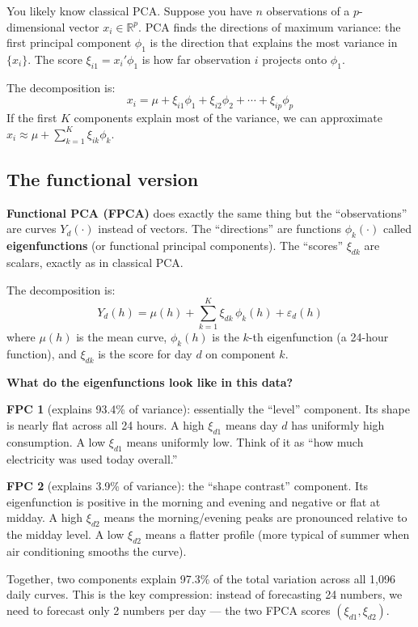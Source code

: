 \documentclass[11pt,a4paper]{article}
\begin{document}
You likely know classical PCA. Suppose you have $n$ observations of a
$p$-dimensional vector $x_i \in \mathbb{R}^p$. PCA finds the directions
of maximum variance: the first principal component $\phi_1$ is the
direction that explains the most variance in $\{x_i\}$. The score
$\xi_{i1} = x_i' \phi_1$ is how far observation $i$ projects onto $\phi_1$.

The decomposition is:
\[
x_i = \mu + \xi_{i1}\phi_1 + \xi_{i2}\phi_2 + \cdots + \xi_{ip}\phi_p
\]
If the first $K$ components explain most of the variance, we can
approximate $x_i \approx \mu + \sum_{k=1}^K \xi_{ik}\phi_k$.

\subsection{The functional version}

\textbf{Functional PCA (FPCA)} does exactly the same thing but the
``observations'' are curves $Y_d(\cdot)$ instead of vectors. The
``directions'' are functions $\phi_k(\cdot)$ called
\textbf{eigenfunctions} (or functional principal components). The
``scores'' $\xi_{dk}$ are scalars, exactly as in classical PCA.

The decomposition is:
\[
Y_d(h) = \mu(h) + \sum_{k=1}^{K} \xi_{dk}\,\phi_k(h) + \varepsilon_d(h)
\]
where $\mu(h)$ is the mean curve, $\phi_k(h)$ is the $k$-th
eigenfunction (a 24-hour function), and $\xi_{dk}$ is the score for
day $d$ on component $k$.

\begin{intuitionbox}
\textbf{What do the eigenfunctions look like in this data?}

\textbf{FPC 1} (explains 93.4\% of variance): essentially the
``level'' component. Its shape is nearly flat across all 24 hours.
A high $\xi_{d1}$ means day $d$ has uniformly high consumption.
A low $\xi_{d1}$ means uniformly low. Think of it as ``how much
electricity was used today overall.''

\textbf{FPC 2} (explains 3.9\% of variance): the ``shape contrast''
component. Its eigenfunction is positive in the morning and evening
and negative or flat at midday. A high $\xi_{d2}$ means the
morning/evening peaks are pronounced relative to the midday level.
A low $\xi_{d2}$ means a flatter profile (more typical of summer
when air conditioning smooths the curve).
\end{intuitionbox}

Together, two components explain 97.3\% of the total variation across
all 1,096 daily curves. This is the key compression: instead of
forecasting 24 numbers, we need to forecast only 2 numbers per day ---
the two FPCA scores $(\xi_{d1}, \xi_{d2})$.
\end{document}
